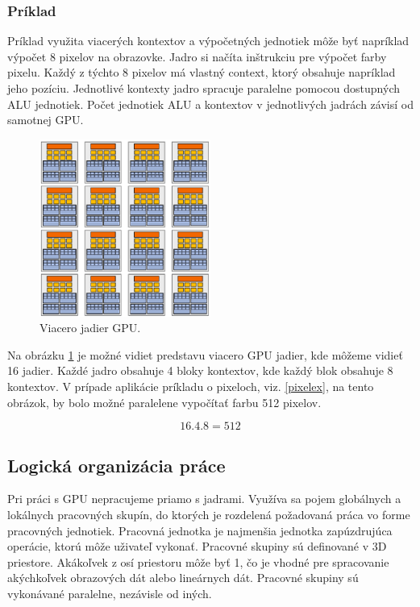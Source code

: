 \label{pixelex}
\subsubsection*{Príklad}
Príklad využita viacerých kontextov a výpočetných jednotiek môže byť napríklad výpočet 8 pixelov na obrazovke. Jadro si načíta inštrukciu pre výpočet farby pixelu. Každý z týchto 8 pixelov má vlastný context, ktorý obsahuje napríklad jeho pozíciu. Jednotlivé kontexty jadro spracuje paralelne pomocou dostupných ALU jednotiek. Počet jednotiek ALU a kontextov v jednotlivých jadrách závisí od samotnej GPU.

\begin{figure}[H]
	\centering
	\includegraphics[width=0.5\textwidth]{obrazky-figures/gpucores.eps}
	\caption{Viacero jadier GPU.}
	\label{gpucores}
\end{figure}

Na obrázku \ref{gpucores} je možné vidiet predstavu viacero GPU jadier, kde môžeme vidieť 16 jadier. Každé jadro obsahuje 4 bloky kontextov, kde každý blok obsahuje 8 kontextov. V prípade aplikácie príkladu o pixeloch, viz. \ref{pixelex}, na tento obrázok, by bolo možné paralelene vypočítať farbu 512 pixelov.

\begin{equation}
	16 . 4 . 8 = 512
	\label{eq:pixeleq}
\end{equation}

\subsection*{Logická organizácia práce}
\label{workgrouplogic}
Pri práci s GPU nepracujeme priamo s jadrami. Využíva sa pojem globálnych a lokálnych pracovných skupín, do ktorých je rozdelená požadovaná práca vo forme pracovných jednotiek. Pracovná jednotka je najmenšia jednotka zapúzdrujúca operácie, ktorú môže uživateľ vykonať.
Pracovné skupiny sú definované v 3D priestore. Akákoľvek z osí priestoru môže byť 1, čo je vhodné pre spracovanie akýchkoľvek obrazových dát alebo lineárnych dát. Pracovné skupiny sú vykonávané paralelne, nezávisle od iných.

